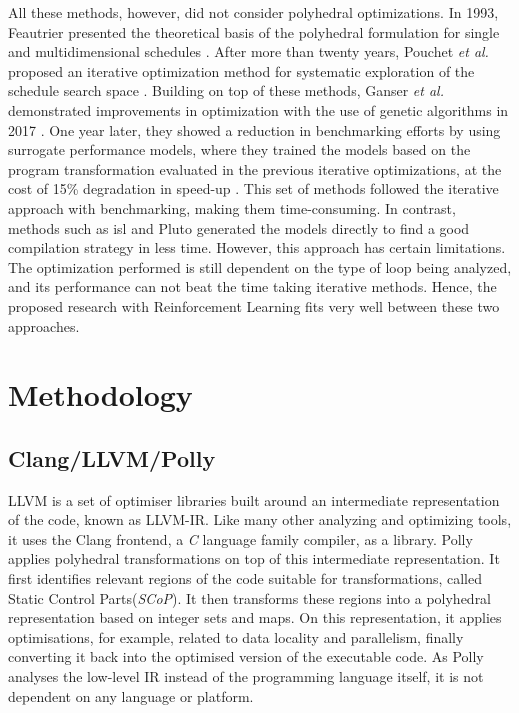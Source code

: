 \documentclass[logo,msc]{infthesis}           %
\begin{document}
All these methods, however, did not consider polyhedral optimizations. In 1993, Feautrier presented the theoretical basis of the polyhedral formulation for single and multidimensional schedules \cite{single}\cite{multi}. After more than twenty years, Pouchet \textit{et al.} proposed an iterative optimization method for systematic exploration of the schedule search space \cite{it_Single}\cite{it_multi}. Building on top of these methods, Ganser \textit{et al.} demonstrated improvements in optimization with the use of genetic algorithms in 2017 \cite{10.1145/3109482}. One year later, they showed a reduction in benchmarking efforts by using surrogate performance models, where they trained the models based on the program transformation evaluated in the previous iterative optimizations, at the cost of 15\% degradation in speed-up \cite{10.1145/3291773}. This set of methods followed the iterative approach with benchmarking, making them time-consuming. In contrast, methods such as isl\cite{isl} and Pluto\cite{Bondhugula07pluto:a} generated the models directly to find a good compilation strategy in less time. However, this approach has certain limitations. The optimization performed is still dependent on the type of loop being analyzed, and its performance can not beat the time taking iterative methods. Hence, the proposed research with Reinforcement Learning fits very well between these two approaches.

\chapter{Methodology}

\section{Clang/LLVM/Polly}

LLVM is a set of optimiser libraries built around an intermediate representation of the code, known as LLVM-IR. Like many other analyzing and optimizing tools, it uses the Clang frontend, a \textit{C} language family compiler, as a library.
Polly applies polyhedral transformations on top of this intermediate representation. It first identifies relevant regions of the code suitable for transformations, called Static Control Parts(\textit{SCoP}). It then transforms these regions into a polyhedral representation based on integer sets and maps. On this representation, it applies optimisations, for example, related to data locality and parallelism, finally converting it back into the optimised version of the executable code. As Polly analyses the low-level IR instead of the programming language itself, it is not dependent on any language or platform.
\end{document}
